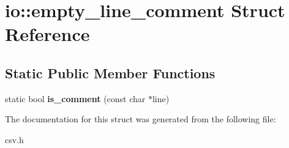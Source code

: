 \section{io\+:\+:empty\+\_\+line\+\_\+comment Struct Reference}
\label{structio_1_1empty__line__comment}
\subsection*{Static Public Member Functions}
\begin{DoxyCompactItemize}
\item 
static bool {\bfseries is\+\_\+comment} (const char $\ast$line)\label{structio_1_1empty__line__comment_a88e2cee044a9aafabf3e2a0e64fa5289}

\end{DoxyCompactItemize}


The documentation for this struct was generated from the following file\+:\begin{DoxyCompactItemize}
\item 
csv.\+h\end{DoxyCompactItemize}
